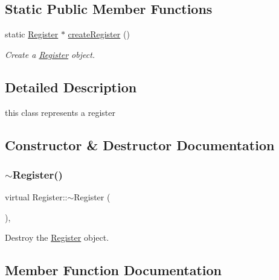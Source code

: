 \subsection*{Static Public Member Functions}
\begin{DoxyCompactItemize}
\item 
static \hyperlink{classRegister}{Register} $\ast$ \hyperlink{classRegister_ae94e883032b0a13d28e1fba375894fb6}{create\+Register} ()
\begin{DoxyCompactList}\small\item\em Create a \hyperlink{classRegister}{Register} object. \end{DoxyCompactList}\end{DoxyCompactItemize}


\subsection{Detailed Description}
this class represents a register 

\subsection{Constructor \& Destructor Documentation}
\mbox{\label{classRegister_ab0464bc35e0902e33d35fff772548e74}} 
\subsubsection{\texorpdfstring{$\sim$\+Register()}{~Register()}}
{\footnotesize\ttfamily virtual Register\+::$\sim$\+Register (\begin{DoxyParamCaption}{ }\end{DoxyParamCaption})\hspace{0.3cm}{\ttfamily [inline]}, {\ttfamily [virtual]}}



Destroy the \hyperlink{classRegister}{Register} object. 



\subsection{Member Function Documentation}
\mbox{\label{classRegister_ae1cb0de5f04828c81d2dbad9650e1d6f}} 
